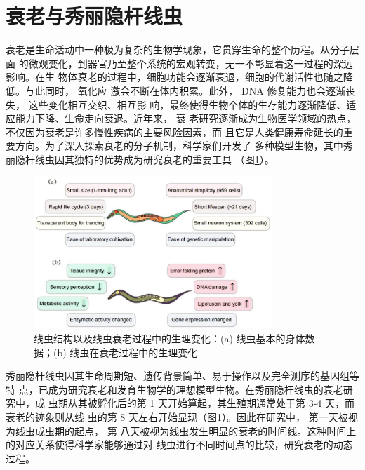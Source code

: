 \section{衰老与秀丽隐杆线虫}

衰老是生命活动中一种极为复杂的生物学现象，它贯穿生命的整个历程。从分子层面 的微观变化，到器官乃至整个系统的宏观转变，无一不彰显着这一过程的深远影响。在生 物体衰老的过程中，细胞功能会逐渐衰退，细胞的代谢活性也随之降低。与此同时， 氧化应 激会不断在体内积累。此外， DNA 修复能力也会逐渐丧失， 这些变化相互交织、相互影 响，最终使得生物个体的生存能力逐渐降低、适应能力下降、生命走向衰退。近年来， 衰 老研究逐渐成为生物医学领域的热点，不仅因为衰老是许多慢性疾病的主要风险因素，而 且它是人类健康寿命延长的重要方向。为了深入探索衰老的分子机制，科学家们开发了 多种模型生物，其中秀丽隐杆线虫因其独特的优势成为研究衰老的重要工具 （图\ref{fig:worm_aging}）。

\begin{figure}[H]
    \centering
    \includegraphics[width=0.8\textwidth]{img/worm_aging.jpg}
    \caption{线虫结构以及线虫衰老过程中的生理变化：(a) 线虫基本的身体数据；(b) 线虫在衰老过程中的生理变化}
    \label{fig:worm_aging}
\end{figure}

秀丽隐杆线虫因其生命周期短、遗传背景简单、易于操作以及完全测序的基因组等特 点，已成为研究衰老和发育生物学的理想模型生物。在秀丽隐杆线虫的衰老研究中，成 虫期从其被孵化后的第 1 天开始算起，其生殖期通常处于第 3-4 天，而衰老的迹象则从线 虫的第 8 天左右开始显现（图\ref{fig:worm_aging}）。因此在研究中， 第一天被视为线虫成虫期的起点， 第 八天被视为线虫发生明显的衰老的时间线。这种时间上的对应关系使得科学家能够通过对 线虫进行不同时间点的比较，研究衰老的动态过程。


